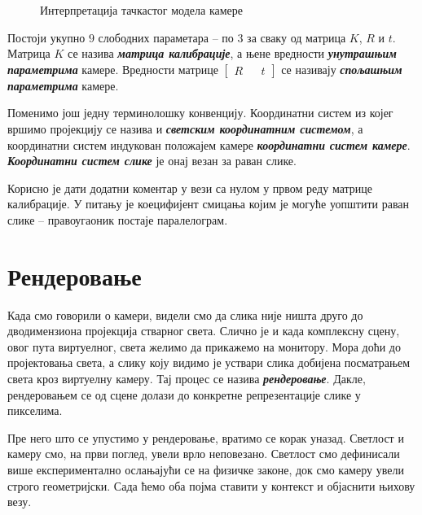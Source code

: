 \documentclass[12pt, a4paper, twoside]{book}
\numberwithin{equation}{chapter}
\numberwithin{theorem}{section}
\numberwithin{definition}{section}
\numberwithin{definitionChapter}{chapter}
\begin{document}
\begin{figure}[H]
\begin{center}
		\end{center}
		\caption{Интерпретација тачкастог модела камере}
		\label{fig-pinhole}
	\end{figure}
	
	Постоји укупно $9$ слободних параметара -- по $3$ за сваку од матрица $K$, $R$ и $t$.
	Матрица $K$ се назива \textbf{\textit{матрица калибрације}}, а њене вредности \textbf{\textit{унутрашњим параметрима}}
	камере. Вредности матрице $\begin{bmatrix}R && t\end{bmatrix}$ се називају \textbf{\textit{спољашњим параметрима}}
	камере.
	
	Поменимо још једну терминолошку конвенцију. Координатни систем из којег вршимо пројекцију се 
	назива и \textbf{\textit{светским координатним системом}}, а координатни систем индукован положајем
	камере \textbf{\textit{координатни систем камере}}. \textbf{\textit{Координатни систем слике}} је
	онај везан за раван слике.

	Корисно је дати додатни коментар у вези са нулом у првом реду матрице калибрације. У питању је коецифијент
	смицања којим је могуће уопштити раван слике -- правоугаоник постаје паралелограм.

\section{Рендеровање}
Када смо говорили о камери, видели смо да слика није ништа друго до дводимензиона пројекција стварног света.
Слично је и када комплексну сцену, овог пута виртуелног, света желимо да прикажемо на монитору. Мора доћи
до пројектовања света, а слику коју видимо је уствари слика добијена посматрањем света кроз виртуелну камеру.
Тај процес се назива \textbf{\textit{рендеровање}}. Дакле, рендеровањем се од сцене долази до конкретне
репрезентације слике у пикселима.

Пре него што се упустимо у рендеровање, вратимо се корак уназад. Светлост и камеру смо, на први поглед, увели
врло неповезано. Светлост смо дефинисали више експериментално ослањајући се на физичке законе, док смо камеру
увели строго геометријски. Сада ћемо оба појма ставити у контекст и објаснити њихову везу.
\end{document}
